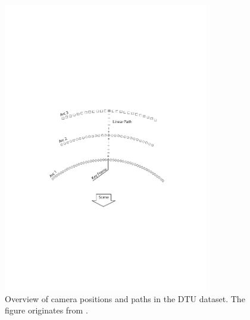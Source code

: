 \documentclass[thesis.tex]{subfiles}
\begin{document}
\begin{figure}[tb]
	\centering
	\includegraphics[width=0.8\textwidth]{img/CameraPosb.pdf}
	\caption{Overview of camera positions and paths in the DTU dataset. The figure originates from \cite{aanaes2010recall}.}
	\label{fig:dtu_overview}
\end{figure}
\end{document}
